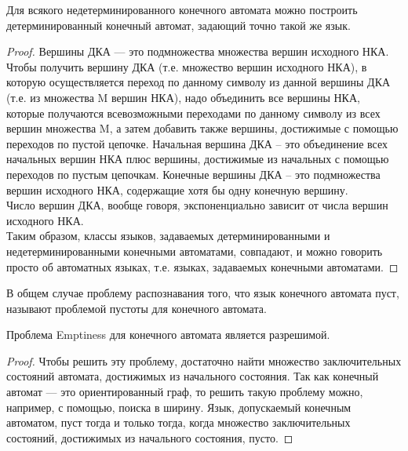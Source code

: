 
    \begin{Thm}
        Для всякого недетерминированного конечного автомата можно построить детерминированный конечный автомат, задающий точно такой же язык. 
    \end{Thm}
    \begin{proof}
        Вершины ДКА --- это подмножества множества вершин исходного НКА. Чтобы получить вершину ДКА (т.е. множество вершин исходного НКА), в которую осуществляется переход по данному символу из данной вершины ДКА (т.е. из множества M вершин НКА), надо объединить все вершины НКА, которые получаются всевозможными переходами по данному символу из всех вершин множества M, а затем добавить также вершины, достижимые с помощью переходов по пустой цепочке. Начальная вершина ДКА -- это объединение всех начальных вершин НКА плюс вершины, достижимые из начальных с помощью переходов по пустым цепочкам. Конечные вершины ДКА -- это подмножества вершин исходного НКА, содержащие хотя бы одну конечную вершину.\\
        Число вершин ДКА, вообще говоря, экспоненциально зависит от числа вершин исходного НКА.\\
        Таким образом, классы языков, задаваемых детерминированными и недетерминированными конечными автоматами, совпадают, и можно говорить просто об автоматных языках, т.е. языках, задаваемых конечными автоматами.
    \end{proof} 
    \begin{Def}
         В общем случае проблему распознавания того, что язык конечного автомата пуст, называют проблемой пустоты для конечного автомата. 
    \end{Def}
    \begin{Thm}
        Проблема Emptiness для конечного автомата является разрешимой.
    \end{Thm}
    \begin{proof}
        Чтобы решить эту проблему, достаточно найти множество заключительных состояний автомата, достижимых из начального состояния. Так как конечный автомат — это ориентированный граф, то решить такую проблему можно, например, с помощью, поиска в ширину. Язык, допускаемый конечным автоматом, пуст тогда и только тогда, когда множество заключительных состояний, достижимых из начального состояния, пусто.
    \end{proof}

